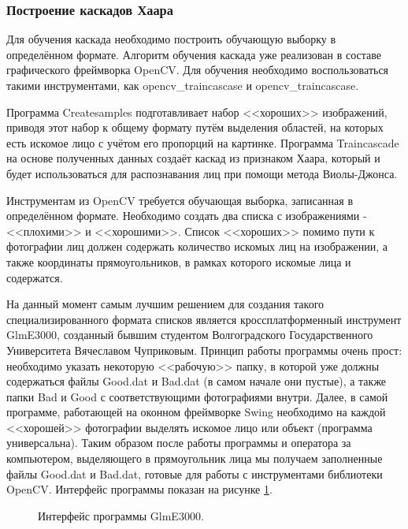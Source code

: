 \documentclass[14pt,a4paper]{scrartcl}
\begin{document}
		\subsubsection{Построение каскадов Хаара}
		
			Для обучения каскада необходимо построить обучающую выборку в определённом формате. Алгоритм обучения каскада уже реализован в составе графического фреймворка OpenCV. Для обучения необходимо воспользоваться такими инструментами, как opencv\_traincascase и opencv\_traincascase. 
			
			Программа Createsamples подготавливает набор <<хороших>> изображений, приводя этот набор к общему формату путём выделения областей, на которых есть искомое лицо с учётом его пропорций на картинке. Программа Traincascade на основе полученных данных создаёт каскад из признаком Хаара, который и будет использоваться для распознавания лиц при помощи метода Виолы-Джонса.
			
			Инструментам из OpenCV требуется обучающая выборка, записанная в определённом формате. Необходимо создать два списка с изображениями - <<плохими>> и <<хорошими>>. Список <<хороших>> помимо пути к фотографии лиц должен содержать количество искомых лиц на изображении, а также координаты прямоугольников, в рамках которого искомые лица и содержатся\cite{bib:Chuprikov_NIR}.
			
			На данный момент самым лучшим решением для создания такого специализированного формата списков является кроссплатформенный инструмент GlmE3000, созданный бывшим студентом Волгоградского Государственного Университета Вячеславом Чуприковым. Принцип работы программы очень прост: необходимо указать некоторую <<рабочую>> папку, в которой уже должны содержаться файлы Good.dat и Bad.dat (в самом начале они пустые), а также папки Bad и Good с соответствующими фотографиями внутри. Далее, в самой программе, работающей на оконном фреймворке Swing необходимо на каждой <<хорошей>> фотографии выделять искомое лицо или объект (программа универсальна). Таким образом после работы программы и оператора за компьютером, выделяющего в прямоугольник лица мы получаем заполненные файлы Good.dat и Bad.dat, готовые для работы с инструментами библиотеки OpenCV. Интерфейс программы показан на рисунке \ref{fig:Glme_3000}.
			
			\begin{figure}[h]
				\caption{Интерфейс программы GlmE3000.}
				\label{fig:Glme_3000}
			\end{figure}
		
\end{document}
